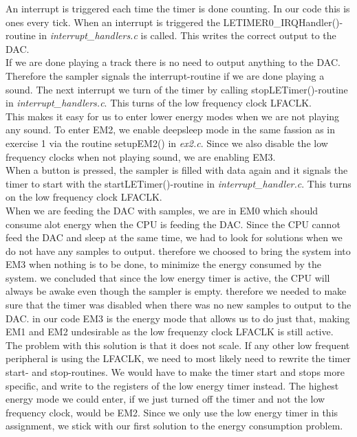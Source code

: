 An interrupt is triggered each time the timer is done counting. In our code this is ones every tick. When an interrupt is triggered the LETIMER0\_IRQHandler()-routine in \emph{interrupt\_handlers.c} is called. This writes the correct output to the DAC. \\

If we are done playing a track there is no need to output anything to the DAC. Therefore the sampler signals the interrupt-routine if we are done playing a sound. The next interrupt we turn of the timer by calling stopLETimer()-routine in \emph{interrupt\_handlers.c}. This turns of the low frequency clock LFACLK.
\\This makes it easy for us to enter lower energy modes when we are not playing any sound. To enter EM2, we enable deepsleep mode in the same fassion as in exercise 1 via the routine setupEM2() in \emph{ex2.c}. Since we also disable the low frequency clocks when not playing sound, we are enabling EM3. \\
When a button is pressed, the sampler is filled with data again and it signals the timer to start with the startLETimer()-routine in \emph{interrupt\_handler.c}. This turns on the low frequency clock LFACLK. \\
 
When we are feeding the DAC with samples, we are in EM0 which should consume alot energy when the CPU is feeding the DAC. Since the CPU cannot feed the DAC and sleep at the same time, we had to look for solutions when we do not have any samples to output. therefore we choosed to bring the system into EM3 when nothing is to be done, to minimize the energy consumed by the system. we concluded that since the low energy timer is active, the CPU will always be awake even though the sampler is empty. therefore we needed to make sure that the timer was disabled when there was no new samples to output to the DAC. in our code EM3 is the energy mode that allows us to do just that, making EM1 and EM2 undesirable as the low frequenzy clock LFACLK is still active. \\

The problem with this solution is that it does not scale. If any other low frequent peripheral is using the LFACLK, we need to most likely need to rewrite the timer start- and stop-routines. We would have to make the timer start and stops more specific, and write to the registers of the low energy timer instead. The highest energy mode we could enter, if we just turned off the timer and not the low frequency clock, would be EM2. Since we only use the low energy timer in this assignment, we stick with our first solution to the energy consumption problem. 
 



